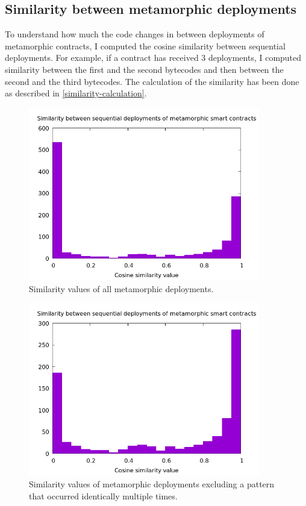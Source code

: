 \subsection{Similarity between metamorphic deployments}

To understand how much the code changes in between deployments of metamorphic contracts, I computed the cosine similarity between sequential deployments. For example, if a contract has received 3 deployments, I computed similarity between the first and the second bytecodes and then between the second and the third bytecodes. The calculation of the similarity has been done as described in \cref{similarity-calculation}.

\begin{figure}
    \centering
    \includegraphics[width=0.9\textwidth]{Figures/analysis/metamorphic-similarities.png}
    \caption{Similarity values of all metamorphic deployments.}
    \label{fig:metamorphic-similarities}
\end{figure}
\begin{figure}
    \centering
    \includegraphics[width=0.9\textwidth]{Figures/analysis/metamorphic-similarities-no-pattern.png}
    \caption{Similarity values of metamorphic deployments excluding a pattern that occurred identically multiple times.}
    \label{fig:metamorphic-similarities-no-pattern}
\end{figure}

